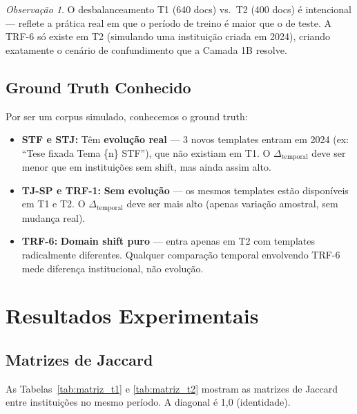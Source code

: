 \documentclass[12pt,a4paper]{article}
\theoremstyle{remark}
\newtheorem{obs}{Observação}[section]
\begin{document}
\begin{obs}
O desbalanceamento T1 (640 docs) vs.\ T2 (400 docs) é intencional — reflete a prática real em que o período de treino é maior que o de teste. A TRF-6 só existe em T2 (simulando uma instituição criada em 2024), criando exatamente o cenário de confundimento que a Camada 1B resolve.
\end{obs}

\subsection{Ground Truth Conhecido}

Por ser um corpus simulado, conhecemos o ground truth:

\begin{itemize}[nosep]
  \item \textbf{STF e STJ:} Têm \textbf{evolução real} — 3 novos templates entram em 2024 (ex: ``Tese fixada Tema \{n\} STF''), que não existiam em T1. O $\Delta_{\text{temporal}}$ deve ser menor que em instituições sem shift, mas ainda assim alto.
  \item \textbf{TJ-SP e TRF-1:} \textbf{Sem evolução} — os mesmos templates estão disponíveis em T1 e T2. O $\Delta_{\text{temporal}}$ deve ser mais alto (apenas variação amostral, sem mudança real).
  \item \textbf{TRF-6:} \textbf{Domain shift puro} — entra apenas em T2 com templates radicalmente diferentes. Qualquer comparação temporal envolvendo TRF-6 mede diferença institucional, não evolução.
\end{itemize}

\newpage

\section{Resultados Experimentais}

\subsection{Matrizes de Jaccard}

As Tabelas~\ref{tab:matriz_t1} e \ref{tab:matriz_t2} mostram as matrizes de Jaccard entre instituições no mesmo período. A diagonal é 1,0 (identidade).
\end{document}
